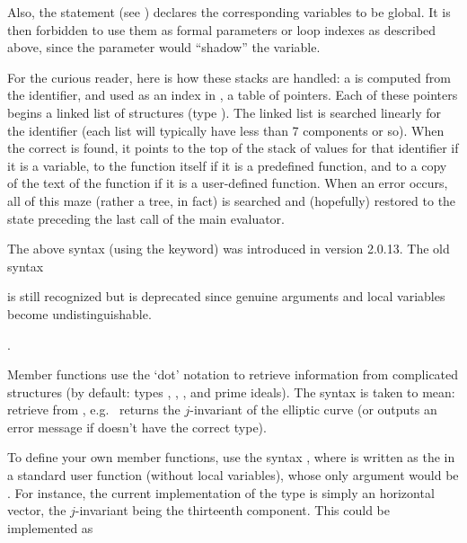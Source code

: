 Also, the statement  (see
) declares the corresponding variables to be global. It
is then forbidden to use them as formal parameters or loop indexes as
described above, since the parameter would ``shadow'' the variable.

 For the curious reader, here is how these
stacks are handled: a  is computed from the identifier,
and used as an index in , a table of pointers. Each of
these pointers begins a linked list of structures (type ).
The linked list is searched linearly for the identifier (each list will
typically have less than 7 components or so). When the correct 
is found, it points to the top of the stack of values for that identifier if
it is a variable, to the function itself if it is a predefined function, and
to a copy of the text of the function if it is a user-defined function. When
an error occurs, all of this maze (rather a tree, in fact) is searched and
(hopefully) restored to the state preceding the last call of the main
evaluator.

 The above syntax (using the  keyword) was
introduced in version 2.0.13. The old syntax

%

\noindent is still recognized but is deprecated since genuine arguments and
local variables become undistinguishable.

.
\label{se:member}

Member functions use the `dot' notation to retrieve information from
complicated structures (by default: types , , ,
 and prime ideals). The syntax  is taken to
mean: retrieve  from , e.g.~ returns
the $j$-invariant of the elliptic curve  (or outputs an error
message if  doesn't have the correct type).

To define your own member functions, use the syntax , where  is written as the  in a
standard user function (without local variables), whose only argument would
be . For instance, the current implementation of the
 type is simply an horizontal vector, the $j$-invariant being the
thirteenth component. This could be implemented as

